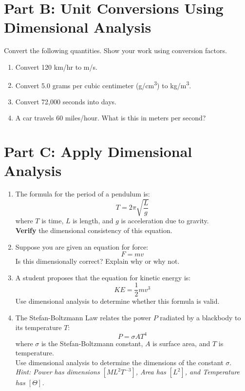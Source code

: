 \documentclass[12pt]{article}
\begin{document}
	\newpage
	\section*{Part B: Unit Conversions Using Dimensional Analysis}
	Convert the following quantities. Show your work using conversion factors.
	
	\begin{enumerate}
		\item Convert 120 km/hr to m/s. \vspace{2cm}
		\item Convert 5.0 grams per cubic centimeter (g/cm\textsuperscript{3}) to kg/m\textsuperscript{3}. \vspace{2cm}
		\item Convert 72,000 seconds into days. \vspace{2cm}
		\item A car travels 60 miles/hour. What is this in meters per second? \vspace{2cm}
	\end{enumerate}
	
	\section*{Part C: Apply Dimensional Analysis}
	
	\begin{enumerate}
		\item The formula for the period of a pendulum is:
		\[
		T = 2\pi \sqrt{\frac{L}{g}}
		\]
		where \(T\) is time, \(L\) is length, and \(g\) is acceleration due to gravity. \\
		\textbf{Verify} the dimensional consistency of this equation. \vspace{2cm}
		
		\item Suppose you are given an equation for force:
		\[
		F = mv
		\]
		Is this dimensionally correct? Explain why or why not. \vspace{2cm}
		
		\item A student proposes that the equation for kinetic energy is:
		\[
		KE = \frac{1}{2}mv^3
		\]
		Use dimensional analysis to determine whether this formula is valid. \vspace{2cm}
		
		\item The Stefan-Boltzmann Law relates the power \(P\) radiated by a blackbody to its temperature \(T\):
		\[
		P = \sigma A T^4
		\]
		where \(\sigma\) is the Stefan-Boltzmann constant, \(A\) is surface area, and \(T\) is temperature. \\
		Use dimensional analysis to determine the dimensions of the constant \(\sigma\). \\
		\textit{Hint: Power has dimensions \([ML^2T^{-3}]\), Area has \([L^2]\), and Temperature has \([\Theta]\).} \vspace{3cm}
	\end{enumerate}
	
\end{document}
